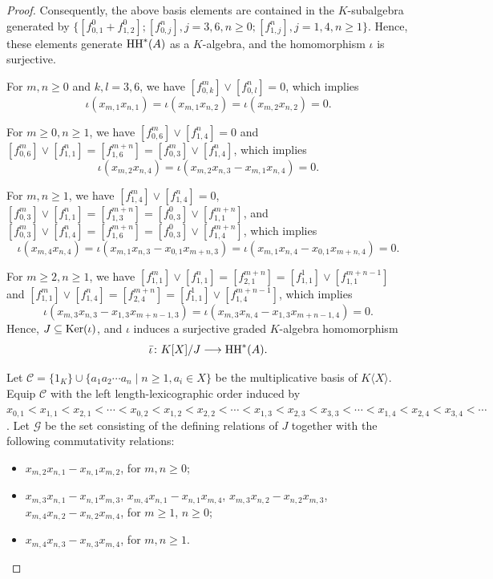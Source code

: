 \documentclass[10pt, reqno]{amsart}
\theoremstyle{definition}
\theoremstyle{remark}
\numberwithin{equation}{section}
\begin{document}
\begin{proof}
Consequently, the above basis elements are contained in the \(K\)-subalgebra generated by \( \{[f_{0,1}^0 + f_{1,2}^0]; [f_{0,j}^n],j=3,6, n\ge 0; [f_{1,j}^n], j=1,4, n\ge 1\} \). Hence, these elements generate \(\mathrm{HH}^*(A)\) as a \(K\)-algebra, and the homomorphism \(\iota\) is surjective.

For \( m,n \ge 0\) and \( k,l=3,6\), we have \( [f_{0,k}^m] \lor [f_{0,l}^n]=0 \), which implies 
\[ \iota (x_{m,1}x_{n,1})=\iota (x_{m,1}x_{n,2})=\iota (x_{m,2}x_{n,2})=0.\]

For \( m \ge 0, n \ge 1\), we have \( [f_{0,6}^m] \lor [f_{1,4}^n]=0 \) and \( [f_{0,6}^m] \lor [f_{1,1}^n]=[f_{1,6}^{m+n}]=[f_{0,3}^m] \lor [f_{1,4}^n] \), which implies 
\[ \iota (x_{m,2}x_{n,4})=\iota (x_{m,2}x_{n,3}-x_{m,1}x_{n,4})=0. \]

For \( m,n \ge 1\), we have \( [f_{1,4}^m] \lor [f_{1,4}^n]=0 \), \( [f_{0,3}^{m}] \lor [f_{1,1}^{n}]= [f_{1,3}^{m+n}] = [f_{0,3}^{0}] \lor [f_{1,1}^{m+n}]\), and \( [f_{0,3}^{m}] \lor [f_{1,4}^{n}]= [f_{1,6}^{m+n}] = [f_{0,3}^0] \lor [f_{1,4}^{m+n}] \), which implies
\[\iota (x_{m,4}x_{n,4})=\iota (x_{m,1}x_{n,3}-x_{0,1}x_{m+n,3})=\iota(x_{m,1}x_{n,4}-x_{0,1}x_{m+n,4})=0.\]

For \( m \ge 2, n \ge 1\), we have \( [f_{1,1}^{m}] \lor [f_{1,1}^{n}]= [f_{2,1}^{m+n}] = [f_{1,1}^{1}] \lor [f_{1,1}^{m+n-1}] \) and \( [f_{1,1}^{m}] \lor [f_{1,4}^{n}]= [f_{2,4}^{m+n}] = [f_{1,1}^{1}] \lor [f_{1,4}^{m+n-1}]\), which implies 
\[\iota (x_{m,3}x_{n,3}-x_{1,3}x_{m+n-1,3})=\iota(x_{m,3}x_{n,4}-x_{1,3}x_{m+n-1,4})=0. \] 
Hence, \( J \subseteq \mathrm{Ker}(\iota)\), and \(\iota\) induces a surjective graded \(K\)-algebra homomorphism
\[ \bar{\iota} \colon K[X]/J \longrightarrow \mathrm{HH}^*(A).\]

Let \(\mathcal{C}=\{1_K\}\cup \{a_1a_2\cdots a_n\mid n\ge 1, a_i\in X\}\) be the multiplicative basis of \(K\langle X \rangle\).
Equip  \(\mathcal{C}\) with the left length-lexicographic order induced by
\(x_{0,1}<x_{1,1}<x_{2,1}<\cdots<x_{0,2}<x_{1,2}<x_{2,2}<\cdots <x_{1,3}<x_{2,3}<x_{3,3}<\cdots<x_{1,4}<x_{2,4}<x_{3,4}<\cdots\).
 Let \(\mathscr{G}\) be the set consisting of the defining relations of \(J\) together with the following commutativity relations: 
  \begin{itemize}
    \item \(x_{m,2}x_{n,1}-x_{n,1}x_{m,2}\), for \(m,n\ge 0\);
    \item \(x_{m,3}x_{n,1}-x_{n,1}x_{m,3}\), \(x_{m,4}x_{n,1}-x_{n,1}x_{m,4}\), \(x_{m,3}x_{n,2}-x_{n,2}x_{m,3}\), \(x_{m,4}x_{n,2}-x_{n,2}x_{m,4}\), for \(m\ge1\), \(n\ge 0\);
     \item  \(x_{m,4}x_{n,3}-x_{n,3}x_{m,4}\), for \(m, n\ge 1\).
 \end{itemize}


\end{proof}
\end{document}
